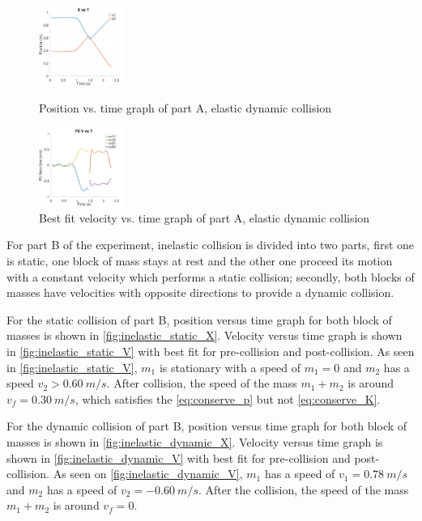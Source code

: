 \documentclass[a4paper, 12pt]{article}
\begin{document}
    \begin{figure}
        \includegraphics[width=0.25\textwidth]{./elastic_dynamic_X.png}
        \caption{Position vs. time graph of part A, elastic dynamic collision}
        \label{fig:elastic_dynamic_X}

        \includegraphics[width=0.25\textwidth]{./elastic_dynamic_Vfit.png}
        \caption{Best fit velocity vs. time graph of part A, elastic dynamic collision}
        \label{fig:elastic_dynamic_V}
    \end{figure}

    \newpage

    For part B of the experiment, inelastic collision is divided into two parts,
    first one is static, one block of mass stays at rest and the other one proceed 
    its motion with a constant velocity which performs a static collision; 
    secondly, both blocks of masses have velocities with opposite directions to provide a dynamic collision.

    For the static collision of part B, position versus time graph for both block of masses is shown in 
    \cref{fig:inelastic_static_X}. Velocity versus time graph is shown in \cref{fig:inelastic_static_V} with best 
    fit for pre-collision and post-collision. As seen in \cref{fig:inelastic_static_V}, $m_1$ is stationary
    with a speed of $m_1 = 0$ and $m_2$ has a speed $v_2 > 0.60~m/s$. After collision, the speed of 
    the mass $m_1 + m_2$ is around $v_f = 0.30~m/s$, which satisfies the \cref{eq:conserve_p} but not \cref{eq:conserve_K}.

    For the dynamic collision of part B, position versus time graph for both block of masses is 
    shown in \cref{fig:inelastic_dynamic_X}. Velocity versus time graph is shown in \cref{fig:inelastic_dynamic_V} 
    with best fit for pre-collision and post-collision. As seen on \cref{fig:inelastic_dynamic_V}, $m_1$
    has a speed of $v_1 = 0.78~m/s$ and $m_2$ has a speed of $v_2 = -0.60~m/s$. After the collision, 
    the speed of the mass $m_1 + m_2$ is around $v_f = 0$.
\end{document}
